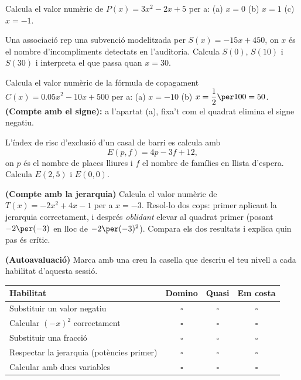 \begin{exercicis}
\begin{exlist}
  \item Calcula el valor numèric de $P(x) = 3x^2 - 2x + 5$ per a:
        \quad (a) $x = 0$ \quad (b) $x = 1$ \quad (c) $x = -1$.

  \item Una associació rep una subvenció modelitzada per $S(x) = -15x + 450$,
        on $x$ és el nombre d'incompliments detectats en l'auditoria. Calcula
        $S(0)$, $S(10)$ i $S(30)$ i interpreta el que passa quan $x=30$.

  \item Calcula el valor numèric de la fórmula de copagament
        $C(x) = \num{0,05}x^2 - 10x + 500$ per a:
        \quad (a) $x = -10$ \quad (b) $x = \dfrac{1}{2}\per 100 = 50$.
        \newline \textbf{(Compte amb el signe):} a l'apartat (a), fixa't com el
        quadrat elimina el signe negatiu.

  \item L'índex de risc d'exclusió d'un casal de barri es calcula amb
        \[
        E(p, f) = 4p - 3f + 12,
        \]
        on $p$ és el nombre de places lliures i $f$ el nombre de famílies en
        llista d'espera. Calcula $E(2, 5)$ i $E(0, 0)$.

  \item \textbf{(Compte amb la jerarquia)} Calcula el valor numèric de
        $T(x) = -2x^2 + 4x - 1$ per a $x = -3$. Resol-lo dos cops: primer
        aplicant la jerarquia correctament, i després \emph{oblidant} elevar
        al quadrat primer (posant $-2\per(-3)$ en lloc de $-2\per(-3)^2$).
        Compara els dos resultats i explica quin pas és crític.

  \item \textbf{(Autoavaluació)} Marca amb una creu la casella que descriu el
        teu nivell a cada habilitat d'aquesta sessió.
        \begin{center}
        \renewcommand{\arraystretch}{1.4}
        \begin{tabular}{|p{6.2cm}|c|c|c|}
        \hline
        \textbf{Habilitat} & \textbf{Domino} & \textbf{Quasi} & \textbf{Em costa} \\
        \hline
        Substituir un valor negatiu & $\square$ & $\square$ & $\square$ \\
        \hline
        Calcular $(-x)^2$ correctament & $\square$ & $\square$ & $\square$ \\
        \hline
        Substituir una fracció & $\square$ & $\square$ & $\square$ \\
        \hline
        Respectar la jerarquia (potències primer) & $\square$ & $\square$ & $\square$ \\
        \hline
        Calcular amb dues variables & $\square$ & $\square$ & $\square$ \\
        \hline
        \end{tabular}
        \end{center}


\end{exlist}
\end{exercicis}
